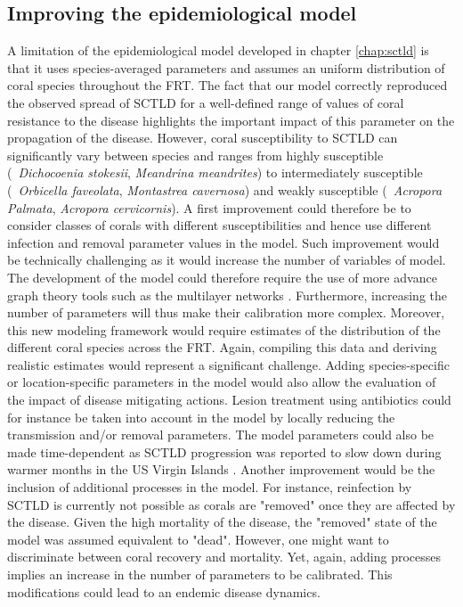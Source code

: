\subsection*{Improving the epidemiological model}
A limitation of the epidemiological model developed in chapter \ref{chap:sctld} is that it uses species-averaged parameters and assumes an uniform distribution of coral species throughout the FRT. The fact that our model correctly reproduced the observed spread of SCTLD for a well-defined range of values of coral resistance to the disease highlights the important impact of this parameter on the propagation of the disease. However, coral susceptibility to SCTLD can significantly vary between species and ranges from highly susceptible (\eg~\textit{Dichocoenia stokesii}, \textit{Meandrina meandrites}) to intermediately susceptible (\eg~\textit{Orbicella faveolata}, \textit{Montastrea cavernosa}) and weakly susceptible (\eg~\textit{Acropora Palmata}, \textit{Acropora cervicornis}). A first improvement could therefore be to consider classes of corals with different susceptibilities and hence use different infection and removal parameter values in the model. Such improvement would be technically challenging as it would increase the number of variables of model. The development of the model could therefore require the use of more advance graph theory tools such as the multilayer networks \citep{kivela2014multilayer,pilosof2017multilayer}. Furthermore, increasing the number of parameters will thus make their calibration more complex. Moreover, this new modeling framework would require estimates of the distribution of the different coral species across the FRT. Again, compiling this data and deriving realistic estimates would represent a significant challenge. Adding species-specific or location-specific parameters in the model would also allow the evaluation of the impact of disease mitigating actions. Lesion treatment using antibiotics could for instance be taken into account in the model by locally reducing the transmission and/or removal parameters. The model parameters could also be made time-dependent as SCTLD progression was reported to slow down during warmer months in the US Virgin Islands \citep{meiling20203d}. Another improvement would be the inclusion of additional processes in the model. For instance, reinfection by SCTLD is currently not possible as corals are "removed" once they are affected by the disease. Given the high mortality of the disease, the "removed" state of the model was assumed equivalent to "dead". However, one might want to discriminate between coral recovery and mortality. Yet, again, adding processes implies an increase in the number of parameters to be calibrated. This modifications could lead to an endemic disease dynamics. 

